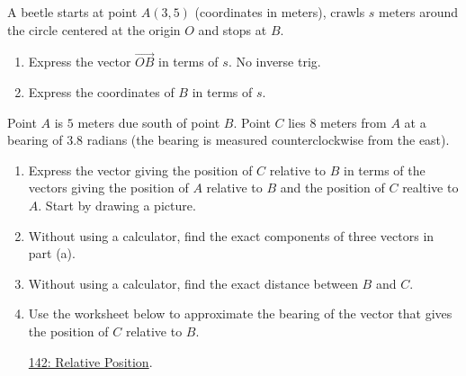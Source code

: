 \documentclass{ximera}
\begin{document}
\begin{question} \label{QIDIFDfeD}
A beetle starts at point $A(3,5)$ (coordinates in meters), crawls $s$ meters around the circle centered at the origin $O$ and stops at $B$.

\begin{enumerate}
\item Express the vector $\overrightarrow{OB}$ in terms of $s$. No inverse trig.

\item Express the coordinates of $B$ in terms of $s$.
\end{enumerate}
\end{question}



\begin{question}  \label{Q9dfrwDSFD}
Point $A$ is $5$ meters due south of point $B$. Point $C$ lies $8$ meters from $A$ at a bearing of $3.8$ radians (the bearing is measured counterclockwise from the east).

\begin{enumerate}
\item Express the vector giving the position of $C$ relative to $B$ in terms of the vectors giving the position of $A$ relative to $B$ and the position of $C$ realtive to $A$. Start by drawing a picture.

\item Without using a calculator, find the exact components of three vectors in part (a).

\item Without using a calculator, find the exact distance between $B$ and $C$.

\item Use the worksheet below to approximate the bearing  of the vector that gives the position of $C$ relative to $B$.

\href{https://www.geogebra.org/classic/bhdsgxtx}{142: Relative Position}.

 
\begin{onlineOnly}
    \begin{center}
\end{center}
\end{onlineOnly}
\end{enumerate}
\end{question}
\end{document}
